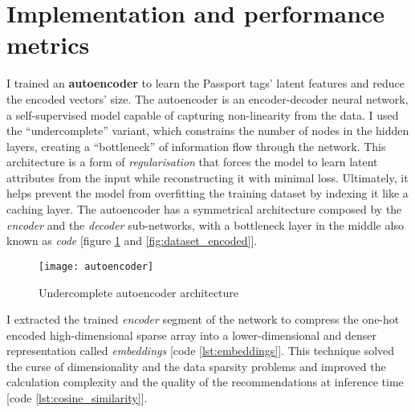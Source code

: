 
\section{Implementation and performance metrics}

I trained an \textbf{autoencoder} \cite{DBLP:journals/corr/abs-2003-05991,DBLP:journals/corr/abs-2201-03898}
to learn the Passport tags' latent features and reduce the encoded vectors' size.
The autoencoder is an encoder-decoder neural network, a self-supervised model capable of capturing non-linearity from the data.
I used the ``undercomplete'' variant, which constrains the number of nodes in the hidden layers, creating a ``bottleneck''
of information flow through the network.
This architecture is a form of \textit{regularisation} that forces the model to learn latent attributes from the input
while reconstructing it with minimal loss. Ultimately, it helps prevent the model from overfitting the training dataset by indexing it like a caching layer.
The autoencoder has a symmetrical architecture composed by the \textit{encoder} and the \textit{decoder} sub-networks,
with a bottleneck layer in the middle also known as \textit{code} [figure \ref{fig:autoencoder} and \ref{fig:dataset_encoded}].

\begin{figure}[H]
  \centering
  \texttt{[image: autoencoder]}
  \caption{Undercomplete autoencoder architecture}
  \label{fig:autoencoder}
\end{figure}

I extracted the trained \textit{encoder} segment of the network to compress the one-hot encoded high-dimensional sparse array into
a lower-dimensional and denser representation called \textit{embeddings} \cite{GoogleForDevelopers:Embeddings} [code \ref{lst:embeddings}].
This technique solved the curse of dimensionality and the data sparsity problems and improved the calculation
complexity and the quality of the recommendations at inference time [code \ref{lst:cosine_similarity}].


